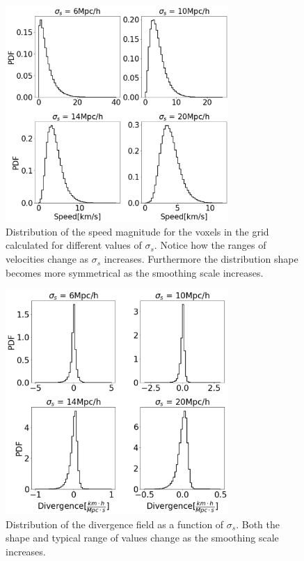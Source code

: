 \documentclass[usenatbib]{mnras}
\begin{document}
\begin{figure}
    \centering
    \includegraphics[width=240pt]{smooth_vel_dist.pdf}
    \caption{Distribution of the speed magnitude for the voxels in the
      grid calculated for different values of $\sigma_{s}$. 
      Notice how the ranges of velocities change as $\sigma_{s}$
      increases.
    Furthermore the distribution shape becomes more symmetrical as the
    smoothing scale increases.}
    \label{fig:smooth_vel_dist}
\end{figure}



\begin{figure}
    \centering
    \includegraphics[width=240pt]{smooth_grad_dist.pdf}
    \caption{Distribution of the divergence field as a function of
      $\sigma_s$.
    Both the shape and typical range of values change as the
    smoothing scale increases.} 
    \label{fig:smooth_grad_dist}
\end{figure}
\end{document}
